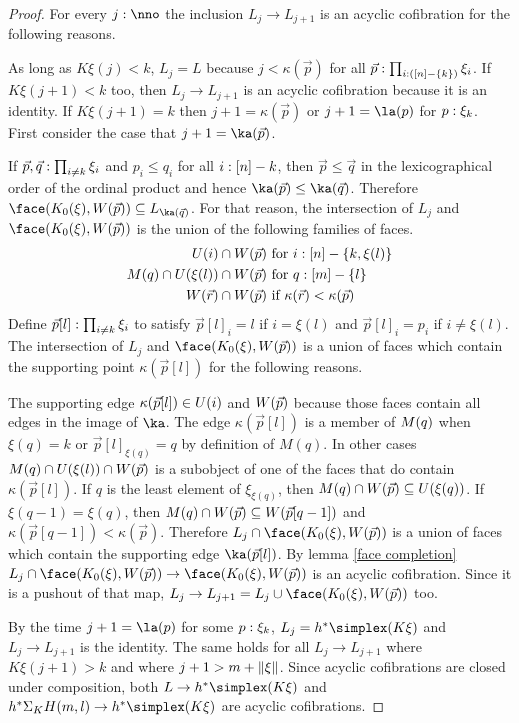\begin{proof}
For every $j\of\nno$ the inclusion $L_j\to L_{j+1}$ is an acyclic cofibration for the following reasons.

As long as $K\xi(j)<k$, $L_j = L$ because $j<\kappa(\vec p)$ for all $\vec p :\prod_{i:([n]-\left\{k\right\})}\xi_i$. If $K\xi(j+1)<k$ too, then $L_j\to L_{j+1}$ is an acyclic cofibration because it is an identity. If $K\xi(j+1) = k$ then $j+1=\kappa(\vec p)$ or $j+1 = \la(p)$ for $p:\xi_k$. First consider the case that $j+1=\ka(\vec p)$. 

If $\vec p,\vec q:\prod_{i\neq k} \xi_i$ and $p_i\leq q_i$ for all $i:[n]-k$, then $\vec p \leq \vec q$ in the lexicographical order of the ordinal product and hence $\ka(\vec p)\leq \ka(\vec q)$. Therefore $\face(K_0(\xi),\W(\vec p))\subseteq L_{\ka(\vec q)}$. For that reason, the intersection of $L_j$ and $\face(K_0(\xi),\W(\vec p))$ is the union of the following families of faces.
\begin{align*}
U(i)\cap W(\vec p) &\textrm{ for $i:[n]-\left\{k,\xi(l)\right\}$}\\
M(q)\cap U(\xi(l))\cap W(\vec p) &\textrm{ for $q:[m]-\left\{l\right\}$}\\
W(\vec r)\cap W(\vec p) &\textrm{ if $\kappa(\vec r)<\kappa(\vec p)$ }
\end{align*}
Define $\vec p[l]:\prod_{i\neq k} \xi_i$ to satisfy $\vec p[l]_i = l$ if $i=\xi(l)$ and $\vec p[l]_i = p_i$ if $i\neq \xi(l)$. The intersection of $L_j$ and $\face(K_0(\xi),\W(\vec p))$ is a union of faces which contain the supporting point $\kappa(\vec p[l])$ for the following reasons. 

The supporting edge $\kappa(\vec p[l])\in U(i)$ and $W(\vec p)$ because those faces contain all edges in the image of $\ka$. The edge $\kappa(\vec p[l])$ is a member of $M(q)$ when $\xi(q)=k$ or $\vec p[l]_{\xi(q)}=q$ by definition of $M(q)$. In other cases $M(q)\cap U(\xi(l))\cap W(\vec p)$ is a subobject of one of the faces that do contain $\kappa(\vec p[l])$. If $q$ is the least element of $\xi_{\xi(q)}$, then $M(q)\cap W(\vec p)\subseteq U(\xi(q))$. If $\xi(q-1)=\xi(q)$, then $M(q)\cap W(\vec p) \subseteq W(\vec p[q-1])$ and $\kappa(\vec p[q-1])<\kappa(\vec p)$. Therefore $L_j\cap \face(K_0(\xi),\W(\vec p))$ is a union of faces which contain the supporting edge $\ka(\vec p[l])$. By lemma \ref{face completion} $L_j\cap \face(K_0(\xi),\W(\vec p))\to \face(K_0(\xi),\W(\vec p))$ is an acyclic cofibration. Since it is a pushout of that map, $L_j\to L_{j+1} = L_j\cup \face(K_0(\xi),\W(\vec p))$ too.

By the time $j+1 = \la(p)$ for some $p: \xi_k$, $L_j = h\ri \simplex(K\xi)$ and $L_j\to L_{j+1}$ is the identity. The same holds for all $L_j\to L_{j+1}$ where $K\xi(j+1)>k$ and where $j+1>m+\Vert \xi \Vert$. Since acyclic cofibrations are closed under composition, both $L\to h\ri \simplex(K\xi)$ and $h\ri \depsum K H(m,l) \to h\ri \simplex(K\xi)$ are acyclic cofibrations.
\end{proof}

